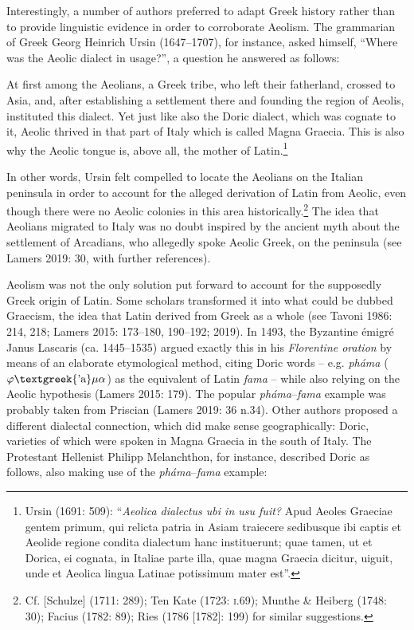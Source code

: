 \begin{styleStandard}
Interestingly, a number of authors preferred to adapt Greek history rather than to provide linguistic evidence in order to corroborate Aeolism. The grammarian of Greek Georg Heinrich Ursin (1647–1707), for instance, asked himself, “Where was the Aeolic dialect in usage?”, a question he answered as follows:
\end{styleStandard}

\begin{styleQuote}
At first among the Aeolians, a Greek tribe, who left their fatherland, crossed to Asia, and, after establishing a settlement there and founding the region of Aeolis, instituted this dialect. Yet just like also the Doric dialect, which was cognate to it, Aeolic thrived in that part of Italy which is called Magna Graecia. This is also why the Aeolic tongue is, above all, the mother of Latin.\footnote{ Ursin (1691: 509): “\textit{Aeolica dialectus ubi in usu fuit?} Apud Aeoles Graeciae gentem primum, qui relicta patria in Asiam traiecere sedibusque ibi captis et Aeolide regione condita dialectum hanc instituerunt; quae tamen, ut et Dorica, ei cognata, in Italiae parte illa, quae magna Graecia dicitur, uiguit, unde et Aeolica lingua Latinae potissimum mater est”.}
\end{styleQuote}

\begin{styleStandard}
In other words, Ursin felt compelled to locate the Aeolians on the Italian peninsula in order to account for the alleged derivation of Latin from Aeolic, even though there were no Aeolic colonies in this area historically.\footnote{ Cf. [Schulze] (1711: 289); Ten Kate (1723: \textsc{i}.69); Munthe \& Heiberg (1748: 30); Facius (1782: 89); Ries (1786 [1782]: 199) for similar suggestions.} The idea that Aeolians migrated to Italy was no doubt inspired by the ancient myth about the settlement of Arcadians, who allegedly spoke Aeolic Greek, on the peninsula (see Lamers 2019: 30, with further references).
\end{styleStandard}

\begin{styleStandard}
Aeolism was not the only solution put forward to account for the supposedly Greek origin of Latin. Some scholars transformed it into what could be dubbed Graecism, the idea that Latin derived from Greek as a whole (see Tavoni 1986: 214, 218; Lamers 2015: 173–180, 190–192; 2019). In 1493, the Byzantine émigré Janus Lascaris (ca. 1445–1535) argued exactly this in his \textit{Florentine oration} by means of an elaborate etymological method, citing Doric words – e.g. \textit{pháma }($\varphi \text{\textgreek{'a}}\mu \alpha $) as the equivalent of Latin \textit{fama} – while also relying on the Aeolic hypothesis (Lamers 2015: 179). The popular \textit{pháma}–\textit{fama }example was probably taken from Priscian (Lamers 2019: 36 n.34). Other authors proposed a different dialectal connection, which did make sense geographically: Doric, varieties of which were spoken in Magna Graecia in the south of Italy. The Protestant Hellenist Philipp Melanchthon, for instance, described Doric as follows, also making use of the \textit{pháma}–\textit{fama }example:
\end{styleStandard}

